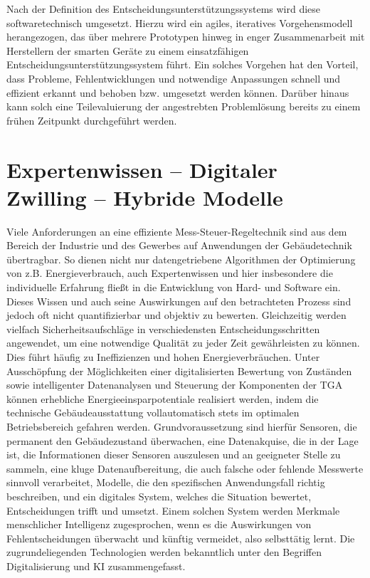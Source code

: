 Nach der Definition des Entscheidungsunterstützungssystems wird diese softwaretechnisch umgesetzt. Hierzu wird ein agiles, iteratives Vorgehensmodell herangezogen, das über mehrere Prototypen hinweg in enger Zusammenarbeit mit Herstellern der smarten Geräte zu einem einsatzfähigen Entscheidungsunterstützungssystem führt. Ein solches Vorgehen hat den Vorteil, dass Probleme, Fehlentwicklungen und notwendige Anpassungen schnell und effizient erkannt und behoben bzw. umgesetzt werden können. Darüber hinaus kann solch eine Teilevaluierung der angestrebten Problemlösung bereits zu einem frühen Zeitpunkt  durchgeführt werden.

\section{Expertenwissen – Digitaler Zwilling – Hybride Modelle}
Viele Anforderungen an eine effiziente Mess-Steuer-Regeltechnik sind aus dem Bereich der Industrie und des Gewerbes auf Anwendungen der Gebäudetechnik übertragbar. So dienen nicht nur datengetriebene Algorithmen der Optimierung von z.B. Energieverbrauch, auch Expertenwissen und hier insbesondere die individuelle Erfahrung fließt in die Entwicklung von Hard- und Software ein. Dieses Wissen und auch seine Auswirkungen auf den betrachteten Prozess sind jedoch oft nicht quantifizierbar und objektiv zu bewerten. Gleichzeitig werden vielfach Sicherheitsaufschläge in verschiedensten Entscheidungsschritten angewendet, um eine notwendige Qualität zu jeder Zeit gewährleisten zu können. Dies führt häufig zu Ineffizienzen und hohen Energieverbräuchen. Unter Ausschöpfung der Möglichkeiten einer digitalisierten Bewertung von Zuständen sowie intelligenter Datenanalysen und Steuerung der Komponenten der \gls{TGA} können erhebliche Energieeinsparpotentiale realisiert werden, indem die technische Gebäudeausstattung vollautomatisch stets im optimalen Betriebsbereich gefahren werden. Grundvoraussetzung sind hierfür Sensoren, die permanent den Gebäudezustand überwachen, eine Datenakquise, die in der Lage ist, die Informationen dieser Sensoren auszulesen und an geeigneter Stelle zu sammeln, eine kluge Datenaufbereitung, die auch falsche oder fehlende Messwerte sinnvoll verarbeitet, Modelle, die den spezifischen Anwendungsfall richtig beschreiben, und ein digitales System, welches die Situation bewertet, Entscheidungen trifft und umsetzt. Einem solchen System werden Merkmale menschlicher Intelligenz zugesprochen, wenn es die Auswirkungen von Fehlentscheidungen überwacht und künftig vermeidet, also selbsttätig lernt. Die zugrundeliegenden Technologien werden bekanntlich unter den Begriffen Digitalisierung und \gls{KI} zusammengefasst.

